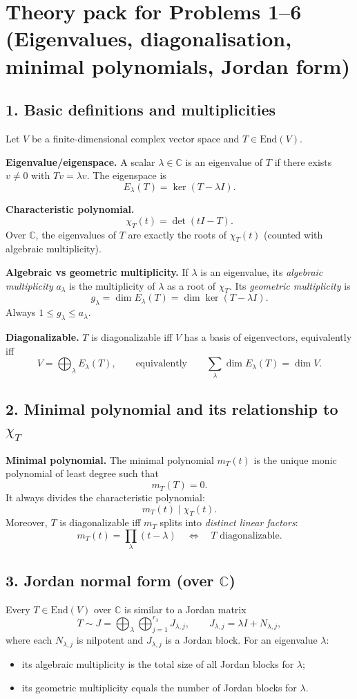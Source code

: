 \documentclass[12pt,a4paper]{article}
\theoremstyle{plain}
\theoremstyle{definition}      %
\begin{document}
\section*{Theory pack for Problems 1--6 (Eigenvalues, diagonalisation, minimal polynomials, Jordan form)}

\subsection*{1. Basic definitions and multiplicities}
Let $V$ be a finite-dimensional complex vector space and $T\in\mathrm{End}(V)$.

\textbf{Eigenvalue/eigenspace.}
A scalar $\lambda\in\mathbb C$ is an eigenvalue of $T$ if there exists $v\neq 0$ with $Tv=\lambda v$.
The eigenspace is
\[
E_\lambda(T)=\ker(T-\lambda I).
\]

\textbf{Characteristic polynomial.}
\[
\chi_T(t)=\det(tI-T).
\]
Over $\mathbb C$, the eigenvalues of $T$ are exactly the roots of $\chi_T(t)$ (counted with algebraic multiplicity).

\textbf{Algebraic vs geometric multiplicity.}
If $\lambda$ is an eigenvalue, its \emph{algebraic multiplicity} $a_\lambda$ is the multiplicity of $\lambda$ as a root of $\chi_T$.
Its \emph{geometric multiplicity} is
\[
g_\lambda=\dim E_\lambda(T)=\dim\ker(T-\lambda I).
\]
Always $1\le g_\lambda\le a_\lambda$.

\textbf{Diagonalizable.}
$T$ is diagonalizable iff $V$ has a basis of eigenvectors, equivalently iff
\[
V=\bigoplus_{\lambda}E_\lambda(T),
\qquad\text{equivalently}\qquad
\sum_{\lambda}\dim E_\lambda(T)=\dim V.
\]

\subsection*{2. Minimal polynomial and its relationship to $\chi_T$}
\textbf{Minimal polynomial.}
The minimal polynomial $m_T(t)$ is the unique monic polynomial of least degree such that
\[
m_T(T)=0.
\]
It always divides the characteristic polynomial:
\[
m_T(t)\mid \chi_T(t).
\]
Moreover, $T$ is diagonalizable iff $m_T$ splits into \emph{distinct linear factors}:
\[
m_T(t)=\prod_{\lambda}(t-\lambda)
\quad\Longleftrightarrow\quad
T \text{ diagonalizable}.
\]

\subsection*{3. Jordan normal form (over $\mathbb C$)}
Every $T\in\mathrm{End}(V)$ over $\mathbb C$ is similar to a Jordan matrix
\[
T \sim J=\bigoplus_{\lambda}\bigoplus_{j=1}^{r_\lambda} J_{\lambda,j},
\qquad
J_{\lambda,j}=\lambda I + N_{\lambda,j},
\]
where each $N_{\lambda,j}$ is nilpotent and $J_{\lambda,j}$ is a Jordan block.
For an eigenvalue $\lambda$:
\begin{itemize}
	\item its algebraic multiplicity is the total size of all Jordan blocks for $\lambda$;
	\item its geometric multiplicity equals the number of Jordan blocks for $\lambda$.
\end{itemize}
\end{document}

